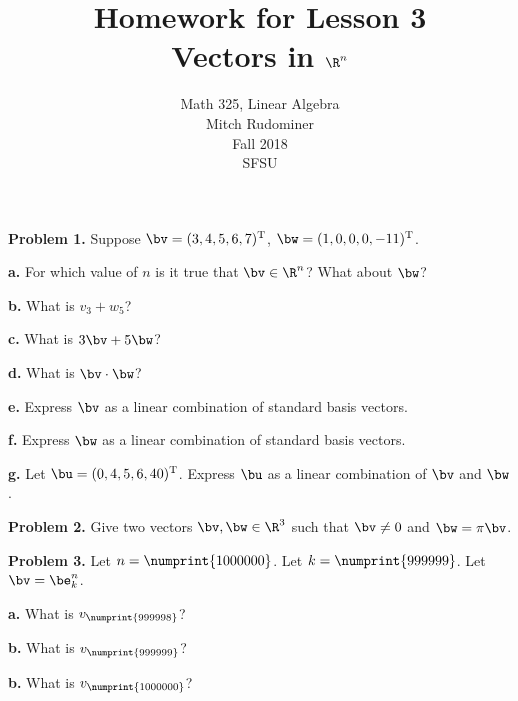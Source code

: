 \documentclass[oneside,12pt]{amsart}
\begin{document}
\title{Homework for Lesson 3 \\ Vectors in $\R^n$}
\author{Math 325, Linear Algebra \\ Mitch Rudominer \\ Fall 2018 \\ SFSU }
\date{}

\maketitle


\textbf{Problem 1.} Suppose $\bv = (3, 4, 5, 6, 7)^{\text{T}}$, $\bw = (1, 0 ,0 , 0, -11)^{\text{T}}$.

\bigskip

\textbf{a.} For which value of $n$ is it true that $\bv \in \R^n$? What
about $\bw$?

\bigskip

\textbf{b.} What is $v_3 + w_5$?

\bigskip

\textbf{c.} What is $3 \bv + 5 \bw$?

\bigskip

\textbf{d.} What is $\bv \cdot \bw$?

\bigskip

\textbf{e.} Express $\bv$ as a linear combination of standard basis vectors.

\bigskip

\textbf{f.} Express $\bw$ as a linear combination of standard basis vectors.

\bigskip

\textbf{g.} Let $\bu = (0, 4, 5, 6, 40)^{\text{T}}$. Express $\bu$ as a linear combination
of $\bv$ and $\bw$.

\bigskip

\textbf{Problem 2.} Give two vectors $\bv,\bw\in\R^3$ such that $\bv\not= 0$
and $\bw = \pi \bv$.

\bigskip

\textbf{Problem 3.} Let $n = \numprint{1000000}$. Let $k = \numprint{999999}$. Let
$\bv = \be^n_k$.

\bigskip

\textbf{a.} What is $v_{\numprint{999998}}$?

\bigskip

\textbf{b.} What is $v_{\numprint{999999}}$?

\bigskip

\textbf{b.} What is $v_{\numprint{1000000}}$?

\bigskip
\end{document}
